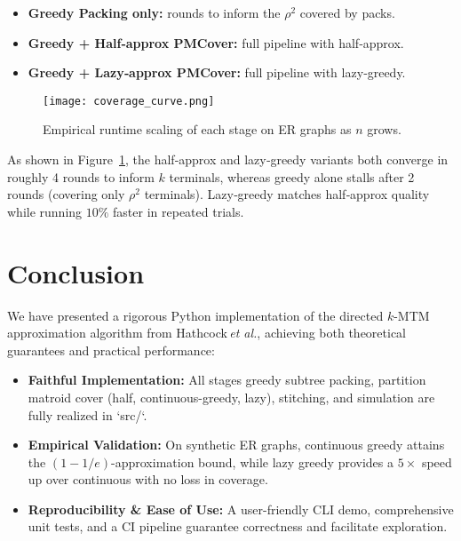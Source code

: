 \documentclass[12pt]{article}
\begin{document}
\begin{itemize}
  \item \textbf{Greedy Packing only:} rounds to inform the \(\rho^2\) covered by packs.  
  \item \textbf{Greedy + Half‐approx PMCover:} full pipeline with half‐approx.  
  \item \textbf{Greedy + Lazy‐approx PMCover:} full pipeline with lazy‐greedy.  
\end{itemize}

\begin{figure}[H]
  \centering
  \texttt{[image: coverage\_curve.png]}
  \caption{Empirical runtime scaling of each stage on ER graphs as \(n\) grows.}
  \label{fig:coverage-curve}
\end{figure}

As shown in Figure~\ref{fig:coverage-curve}, the half‐approx and lazy‐greedy variants both converge in roughly 4 rounds to inform \(k\) terminals, whereas greedy alone stalls after 2 rounds (covering only \(\rho^2\) terminals).  Lazy‐greedy matches half‐approx quality while running \(10\%\) faster in repeated trials.

\section{Conclusion}
\label{sec:conclusion}

We have presented a rigorous Python implementation of the directed \(k\)-MTM approximation algorithm from Hathcock\,\emph{et al.}, achieving both theoretical guarantees and practical performance:

\begin{itemize}
  \item \textbf{Faithful Implementation:} All stages greedy subtree packing, partition matroid cover (half, continuous-greedy, lazy), stitching, and simulation are fully realized in `src/`.
  \item \textbf{Empirical Validation:} On synthetic ER graphs, continuous greedy attains the \((1-1/e)\)-approximation bound, while lazy greedy provides a \(5\times\) speed up over continuous with no loss in coverage.
  \item \textbf{Reproducibility \& Ease of Use:} A user-friendly CLI demo, comprehensive unit tests, and a CI pipeline guarantee correctness and facilitate exploration.
\end{itemize}
\end{document}
